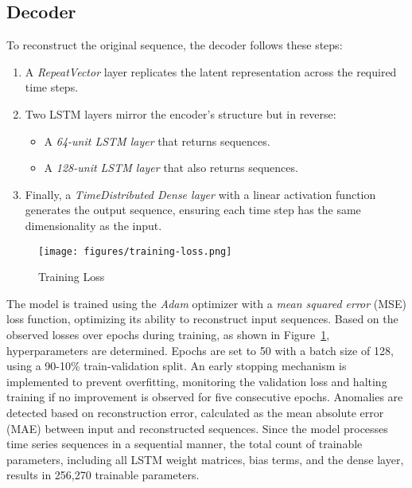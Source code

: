\subsection*{Decoder}  
To reconstruct the original sequence, the decoder follows these steps:  
\begin{enumerate}  
    \item A \textit{RepeatVector} layer replicates the latent representation across the required time steps.  
    \item Two LSTM layers mirror the encoder’s structure but in reverse:  
    \begin{itemize}  
        \item A \textit{64-unit LSTM layer} that returns sequences.  
        \item A \textit{128-unit LSTM layer} that also returns sequences.  
    \end{itemize}  
    \item Finally, a \textit{TimeDistributed Dense layer} with a linear activation function generates the output sequence, ensuring each time step has the same dimensionality as the input.  
\end{enumerate}  


\begin{figure}[htbp!] 
    \centering 
    \texttt{[image: figures/training-loss.png]}
    \caption{Training Loss}
    \centering
    \label{fig:training1}
\end{figure}

The model is trained using the \textit{Adam} optimizer with a \textit{mean squared error} (MSE) loss function, optimizing its ability to reconstruct input sequences. Based on the observed losses over epochs during training, as shown in Figure~\ref{fig:training1}, hyperparameters are determined. Epochs are set to 50 with a batch size of 128, using a 90-10\% train-validation split. An early stopping mechanism is implemented to prevent overfitting, monitoring the validation loss and halting training if no improvement is observed for five consecutive epochs. Anomalies are detected based on reconstruction error, calculated as the mean absolute error (MAE) between input and reconstructed sequences. Since the model processes time series sequences in a sequential manner, the total count of trainable parameters, including all LSTM weight matrices, bias terms, and the dense layer, results in 256,270 trainable parameters. 



